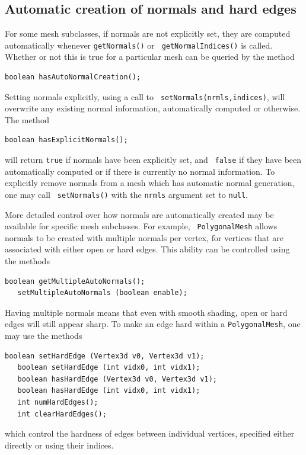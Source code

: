 \subsection{Automatic creation of normals and hard edges}
\label{AutoNormalCreation:sec}

For some mesh subclasses, if normals are not explicitly set, they are
computed automatically whenever {\tt getNormals()} or {\tt
getNormalIndices()} is called. Whether or not this is true
for a particular mesh can be queried by the method
%
\begin{lstlisting}[]
   boolean hasAutoNormalCreation();
\end{lstlisting}
%
Setting normals explicitly, using a call to {\tt
setNormals(nrmls,indices)}, will overwrite any existing normal information,
automatically computed or otherwise. The method
%
\begin{lstlisting}[]
   boolean hasExplicitNormals();
\end{lstlisting}
%
will return {\tt true} if normals have been explicitly set, and {\tt
false} if they have been automatically computed or if there is
currently no normal information. To explicitly remove normals from a
mesh which has automatic normal generation, one may call {\tt
setNormals()} with the {\tt nrmls} argument set to {\tt null}.

More detailed control over how normals are automatically created may
be available for specific mesh subclasses. For example, {\tt
PolygonalMesh} allows normals to be created with multiple normals per
vertex, for vertices that are associated with either open or hard
edges. This ability can be controlled using the methods
%
\begin{lstlisting}[]
   boolean getMultipleAutoNormals();
   setMultipleAutoNormals (boolean enable);
\end{lstlisting}
%
Having multiple normals means that even with smooth shading, open or
hard edges will still appear sharp. To make an edge hard within
a {\tt PolygonalMesh}, one may use the methods
%
\begin{lstlisting}[]
   boolean setHardEdge (Vertex3d v0, Vertex3d v1);
   boolean setHardEdge (int vidx0, int vidx1);
   boolean hasHardEdge (Vertex3d v0, Vertex3d v1);
   boolean hasHardEdge (int vidx0, int vidx1);
   int numHardEdges();
   int clearHardEdges();
\end{lstlisting}
%
which control the hardness of edges between individual vertices,
specified either directly or using their indices.

